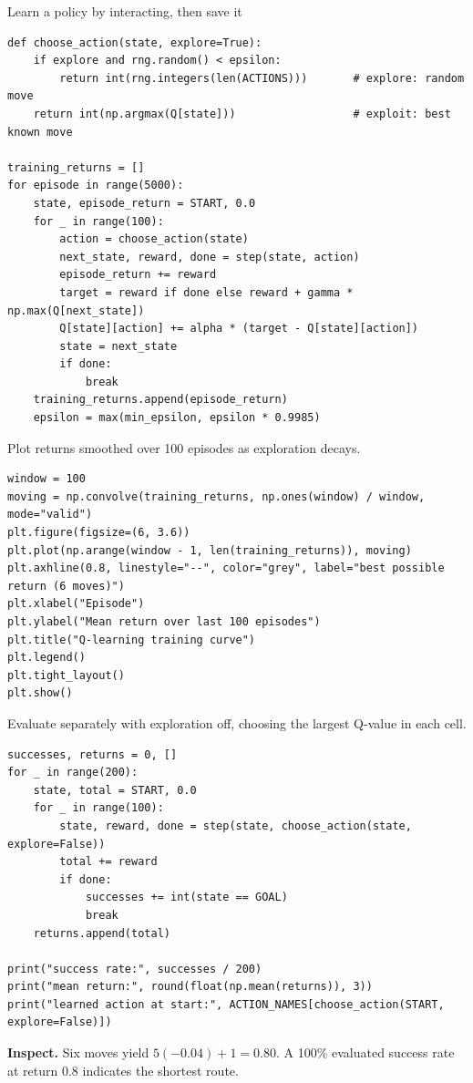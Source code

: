 \begin{labproject}{Learn a policy by interacting, then save it}
\begin{lstlisting}[style=utppython]
def choose_action(state, explore=True):
    if explore and rng.random() < epsilon:
        return int(rng.integers(len(ACTIONS)))       # explore: random move
    return int(np.argmax(Q[state]))                  # exploit: best known move

training_returns = []
for episode in range(5000):
    state, episode_return = START, 0.0
    for _ in range(100):
        action = choose_action(state)
        next_state, reward, done = step(state, action)
        episode_return += reward
        target = reward if done else reward + gamma * np.max(Q[next_state])
        Q[state][action] += alpha * (target - Q[state][action])
        state = next_state
        if done:
            break
    training_returns.append(episode_return)
    epsilon = max(min_epsilon, epsilon * 0.9985)
\end{lstlisting}

Plot returns smoothed over 100 episodes as exploration decays.

\begin{lstlisting}[style=utppython]
window = 100
moving = np.convolve(training_returns, np.ones(window) / window, mode="valid")
plt.figure(figsize=(6, 3.6))
plt.plot(np.arange(window - 1, len(training_returns)), moving)
plt.axhline(0.8, linestyle="--", color="grey", label="best possible return (6 moves)")
plt.xlabel("Episode")
plt.ylabel("Mean return over last 100 episodes")
plt.title("Q-learning training curve")
plt.legend()
plt.tight_layout()
plt.show()
\end{lstlisting}

Evaluate separately with exploration off, choosing the largest Q-value in each cell.

\begin{lstlisting}[style=utppython]
successes, returns = 0, []
for _ in range(200):
    state, total = START, 0.0
    for _ in range(100):
        state, reward, done = step(state, choose_action(state, explore=False))
        total += reward
        if done:
            successes += int(state == GOAL)
            break
    returns.append(total)

print("success rate:", successes / 200)
print("mean return:", round(float(np.mean(returns)), 3))
print("learned action at start:", ACTION_NAMES[choose_action(START, explore=False)])
\end{lstlisting}

\textbf{Inspect.} Six moves yield $5(-0.04)+1=0.80$. A 100\% evaluated success rate at return 0.8 indicates the shortest route.


\end{labproject}
